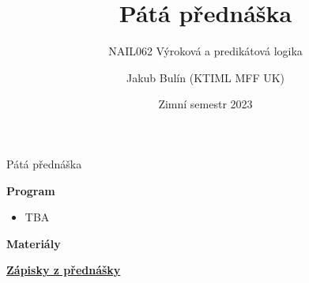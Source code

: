 \documentclass{beamer}
\title{Pátá přednáška}
\subtitle{NAIL062 Výroková a predikátová logika}
\author{Jakub Bulín (KTIML MFF UK)}
\date{Zimní semestr 2023}
\begin{document}
\frame{\titlepage}


\begin{frame}{Pátá přednáška}

    \textbf{Program}
        \begin{itemize}
            \item TBA
        \end{itemize}        
    

    \textbf{Materiály}

        \href{https://github.com/jbulin-mff-uk/nail062/raw/main/lecture/lecture-notes/lecture-notes.pdf}{\alert{\textbf{Zápisky z přednášky}}}%

\end{frame}
\end{document}
